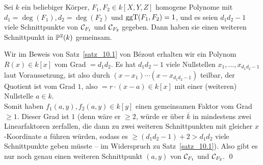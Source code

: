 \begin{satz}
\label{satz_10.15}
	Sei $k$ ein beliebiger Körper, $F_1,F_2 \in k[X,Y,Z]$ homogene Polynome mit $d_1 = \deg(F_1), d_2 = \deg(F_2)$ und $\operatorname{ggT}(F_1,F_2) = 1$, und es seien $d_1d_2 - 1$ viele Schnittpunkte von $\mathcal{C}_{F_1}$ und $\mathcal{C}_{F_2}$ gegeben. Dann haben sie einen weiteren Schnittpunkt in $\mathbb{P}^2(k)$ gemeinsam.
\end{satz}

	Wir im Beweis von Satz~\ref{satz_10.1} von Bézout erhalten wir ein Polynom $R(x) \in k[x]$ vom Grad $=d_1d_2$. Es hat $d_1d_2-1$ viele Nullstellen $x_1, \dots, x_{d_1 d_2-1}$ laut Voraussetzung, ist also durch $(x-x_1) \cdots (x-x_{d_1d_2-1})$ teilbar, der Quotient ist vom Grad $1$, also $=r \cdot (x-a) \in k[x]$ mit einer (weiteren) Nullstelle $a \in k$.\\
	Somit haben $f_1(a,y), f_2(a,y) \in k[y]$ einen gemeinsamen Faktor vom Grad $\geq 1$. Dieser Grad ist $1$ (denn wäre er $\geq 2$, würde er über $\overline{k}$ in mindestens zwei Linearfaktoren zerfallen, die dann zu zwei weiteren Schnittpunkten mit gleicher $x$-Koordinate $a$ führen würden, sodass es $\geq (d_1d_2-1)+2 > d_1d_2$ viele Schnittpunkte geben müsste -- im Widerspruch zu Satz~\ref{satz_10.1}). Also gibt es nur noch genau einen weiteren Schnittpunkt $(a,y)$ von $\mathcal{C}_{F_1}$ und $\mathcal{C}_{F_2}$. \qed